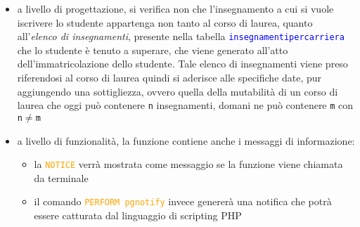 \documentclass{article}
\newcommand{\tabb}[1]{\texttt{\textcolor{blue}{#1}}}
\newcommand{\sqlcommand}[1]{\texttt{\textcolor{orange}{#1}}}
\newcommand{\und}[0]{\textunderscore}
\begin{document}
\begin{itemize}
    \item a livello di progettazione, si verifica non che l'insegnamento a cui si vuole iscrivere lo studente appartenga non tanto al corso di laurea, quanto all'\textit{elenco di insegnamenti}, presente nella tabella \tabb{insegnamenti\und per\und carriera} che lo studente è tenuto a superare, che viene generato all'atto dell'immatricolazione dello studente. Tale elenco di insegnamenti viene preso riferendosi al corso di laurea quindi si aderisce alle specifiche date, pur aggiungendo una sottigliezza, ovvero quella della mutabilità di un corso di laurea che oggi può contenere \texttt{n} insegnamenti, domani ne può contenere \texttt{m} con \texttt{n}$\neq$\texttt{m}
    \item a livello di funzionalità, la funzione contiene anche i messaggi di informazione:
    \begin{itemize}
        \item la \sqlcommand{NOTICE} verrà mostrata come messaggio se la funzione viene chiamata da terminale
        \item il comando \sqlcommand{PERFORM pg\und notify} invece genererà una notifica che potrà essere catturata dal linguaggio di scripting PHP
    \end{itemize}
\end{itemize}
\end{document}
